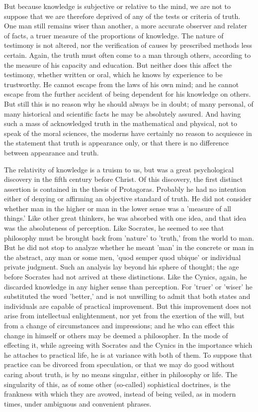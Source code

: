 \documentclass[11pt,letter]{article}
\begin{document}
\par  But because knowledge is subjective or relative to the mind, we are not to suppose that we are therefore deprived of any of the tests or criteria of truth. One man still remains wiser than another, a more accurate observer and relater of facts, a truer measure of the proportions of knowledge. The nature of testimony is not altered, nor the verification of causes by prescribed methods less certain. Again, the truth must often come to a man through others, according to the measure of his capacity and education. But neither does this affect the testimony, whether written or oral, which he knows by experience to be trustworthy. He cannot escape from the laws of his own mind; and he cannot escape from the further accident of being dependent for his knowledge on others. But still this is no reason why he should always be in doubt; of many personal, of many historical and scientific facts he may be absolutely assured. And having such a mass of acknowledged truth in the mathematical and physical, not to speak of the moral sciences, the moderns have certainly no reason to acquiesce in the statement that truth is appearance only, or that there is no difference between appearance and truth.

\par  The relativity of knowledge is a truism to us, but was a great psychological discovery in the fifth century before Christ. Of this discovery, the first distinct assertion is contained in the thesis of Protagoras. Probably he had no intention either of denying or affirming an objective standard of truth. He did not consider whether man in the higher or man in the lower sense was a 'measure of all things.' Like other great thinkers, he was absorbed with one idea, and that idea was the absoluteness of perception. Like Socrates, he seemed to see that philosophy must be brought back from 'nature' to 'truth,' from the world to man. But he did not stop to analyze whether he meant 'man' in the concrete or man in the abstract, any man or some men, 'quod semper quod ubique' or individual private judgment. Such an analysis lay beyond his sphere of thought; the age before Socrates had not arrived at these distinctions. Like the Cynics, again, he discarded knowledge in any higher sense than perception. For 'truer' or 'wiser' he substituted the word 'better,' and is not unwilling to admit that both states and individuals are capable of practical improvement. But this improvement does not arise from intellectual enlightenment, nor yet from the exertion of the will, but from a change of circumstances and impressions; and he who can effect this change in himself or others may be deemed a philosopher. In the mode of effecting it, while agreeing with Socrates and the Cynics in the importance which he attaches to practical life, he is at variance with both of them. To suppose that practice can be divorced from speculation, or that we may do good without caring about truth, is by no means singular, either in philosophy or life. The singularity of this, as of some other (so-called) sophistical doctrines, is the frankness with which they are avowed, instead of being veiled, as in modern times, under ambiguous and convenient phrases.
\end{document}
